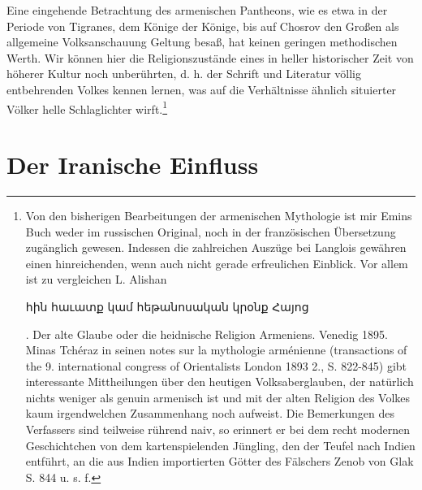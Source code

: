 \documentclass{article}
\begin{document}
Eine eingehende Betrachtung des armenischen Pantheons, wie es etwa in der Periode von Tigranes, dem Könige der Könige, bis auf Chosrov den Großen als allgemeine Volksanschauung Geltung besaß, hat keinen geringen methodischen Werth. Wir können hier die Religionszustände eines in heller historischer Zeit von höherer Kultur noch unberührten, d. h. der Schrift und Literatur völlig entbehrenden Volkes kennen lernen, was auf die Verhältnisse ähnlich situierter Völker helle Schlaglichter wirft.\footnote{Von den bisherigen Bearbeitungen der armenischen Mythologie ist mir Emins Buch weder im russischen Original, noch in der französischen Übersetzung zugänglich gewesen. Indessen die zahlreichen Auszüge bei Langlois gewähren einen hinreichenden, wenn auch nicht gerade erfreulichen Einblick. Vor allem ist zu vergleichen L. Alishan \begin{armenian}հին հաւատք կամ հեթանոսական կրօնք Հայոց\end{armenian}. Der alte Glaube oder die heidnische Religion Armeniens. Venedig 1895. Minas Tchéraz in seinen notes sur la mythologie arménienne (transactions of the 9. international congress of Orientalists London 1893 2., S. 822-845) gibt interessante Mittheilungen über den heutigen Volksaberglauben, der natürlich nichts weniger als genuin armenisch ist und mit der alten Religion des Volkes kaum irgendwelchen Zusammenhang noch aufweist. Die Bemerkungen des Verfassers sind teilweise rührend naiv, so erinnert er bei dem recht modernen Geschichtchen von dem kartenspielenden Jüngling, den der Teufel nach Indien entführt, an die aus Indien importierten Götter des Fälschers Zenob von Glak S. 844 u. s. f.}
\clearpage
\section{Der Iranische Einfluss}
\end{document}
